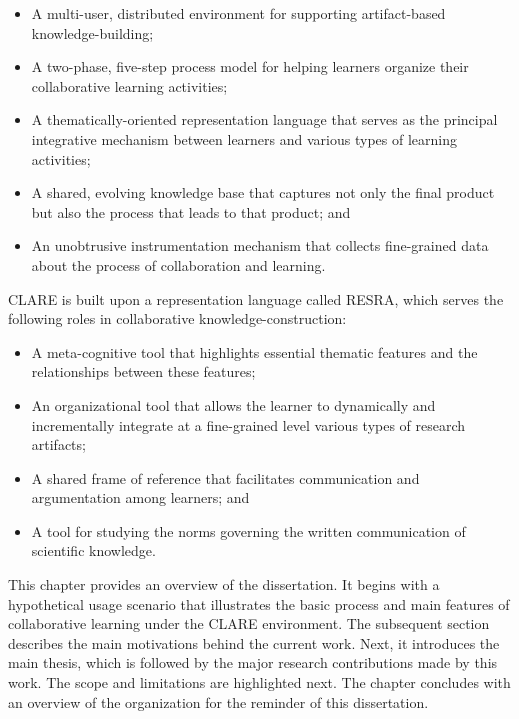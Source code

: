 \begin{itemize}
\item A multi-user, distributed environment for supporting artifact-based
  knowledge-building;
  
\item A two-phase, five-step process model for helping learners organize
  their collaborative learning activities;
  
\item A thematically-oriented representation language that serves as the
  principal integrative mechanism between learners and various types of
  learning activities;
  
\item A shared, evolving knowledge base that captures not only the final
  product but also the process that leads to that product; and 
  
\item An unobtrusive instrumentation mechanism that collects fine-grained
  data about the process of collaboration and learning.
\end{itemize}

CLARE is built upon a representation language called RESRA, which serves
the following roles in collaborative knowledge-construction:

\begin{itemize}
\item A meta-cognitive tool that highlights essential thematic features and
  the relationships between these features;
  
\item An organizational tool that allows the learner to dynamically and
  incrementally integrate at a fine-grained level various types of
  research artifacts;
  
\item A shared frame of reference that facilitates communication and
  argumentation among learners; and
  
\item A tool for studying the norms governing the written communication of
  scientific knowledge.
\end{itemize}

This chapter provides an overview of the dissertation. It begins with a
hypothetical usage scenario that illustrates the basic process and main
features of collaborative learning under the CLARE environment. The
subsequent section describes the main motivations behind the current
work. Next, it introduces the main thesis, which is followed by the major
research contributions made by this work. The scope and limitations are
highlighted next. The chapter concludes with an overview of the
organization for the reminder of this dissertation.


